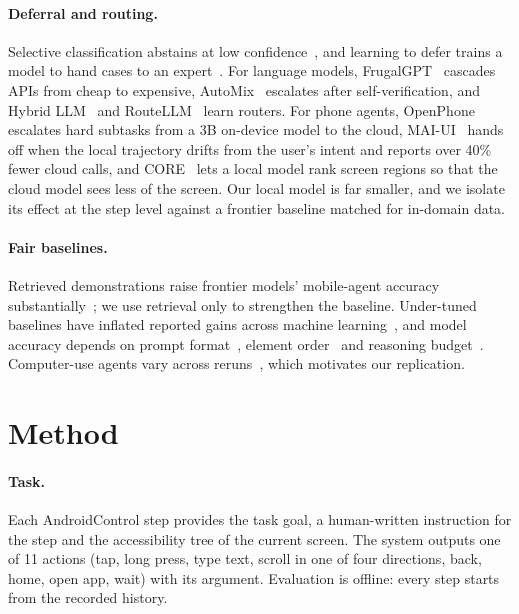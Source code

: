 \documentclass[10pt]{article}
\begin{document}
\paragraph{Deferral and routing.} Selective classification abstains at low confidence~\citep{chow,geifman}, and learning to defer trains a model to hand cases to an expert~\citep{mozannar}. For language models, FrugalGPT~\citep{frugalgpt} cascades APIs from cheap to expensive, AutoMix~\citep{automix} escalates after self-verification, and Hybrid LLM~\citep{hybridllm} and RouteLLM~\citep{routellm} learn routers. For phone agents, OpenPhone~\citep{openphone} escalates hard subtasks from a 3B on-device model to the cloud, MAI-UI~\citep{maiui} hands off when the local trajectory drifts from the user's intent and reports over 40\% fewer cloud calls, and CORE~\citep{core} lets a local model rank screen regions so that the cloud model sees less of the screen. Our local model is far smaller, and we isolate its effect at the step level against a frontier baseline matched for in-domain data.

\paragraph{Fair baselines.} Retrieved demonstrations raise frontier models' mobile-agent accuracy substantially~\citep{learnact,raggui}; we use retrieval only to strengthen the baseline. Under-tuned baselines have inflated reported gains across machine learning~\citep{melis,dacrema,musgrave,lipton}, and model accuracy depends on prompt format~\citep{sclar}, element order~\citep{ordering} and reasoning budget~\citep{inversettc}. Computer-use agents vary across reruns~\citep{cuareliability,beyondpass}, which motivates our replication.

\section{Method}\label{sec:method}
\paragraph{Task.} Each AndroidControl step provides the task goal, a human-written instruction for the step and the accessibility tree of the current screen. The system outputs one of 11 actions (tap, long press, type text, scroll in one of four directions, back, home, open app, wait) with its argument. Evaluation is offline: every step starts from the recorded history.
\end{document}
